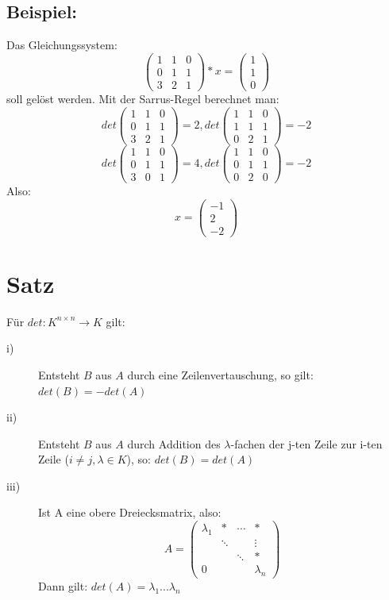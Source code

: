 \documentclass{scrbook}
\begin{document}
\subsection*{Beispiel:}
Das Gleichungssystem:
\[\left(
\begin{array}{ccc}
1&1&0\\
0&1&1\\
3&2&1
\end{array}
\right)*x = 
\left(
\begin{array}{c}
1\\1\\0
\end{array}
\right)\] soll gelöst werden. Mit der Sarrus-Regel berechnet man:
\[det\left(\begin{array}{ccc}
1&1&0\\
0&1&1\\
3&2&1
\end{array}
\right)=2,det\left(\begin{array}{ccc}
1&1&0\\
1&1&1\\
0&2&1
\end{array}
\right)=-2\]
\[det\left(\begin{array}{ccc}
1&1&0\\
0&1&1\\
3&0&1
\end{array}
\right)=4,det\left(\begin{array}{ccc}
1&1&0\\
0&1&1\\
0&2&0
\end{array}
\right)=-2\]
Also:
\[x=\left(\begin{array}{c}
-1\\2\\-2
\end{array}\right)\]
\section{Satz}
Für $det:K^{n\times n} \to K$ gilt:
\begin{description}
\item[i)] Entsteht $B$ aus $A$ durch eine Zeilenvertauschung, so gilt: $det(B) = -det(A)$
\item[ii)] Entsteht $B$ aus $A$ durch Addition des $\lambda$-fachen der j-ten Zeile zur i-ten Zeile ($i \neq j, \lambda \in K$), so: $det(B)=det(A)$
\item[iii)] Ist A eine obere Dreiecksmatrix, also:
\[A=\left(
\begin{array}{cccc}
\lambda_1&*&\cdots&*\\
&\ddots&&\vdots\\
&&\ddots&*\\
0&&&\lambda_n
\end{array}
\right)\]
Dann gilt: $det(A)=\lambda_1 ... \lambda_n$
\end{description}
\end{document}
